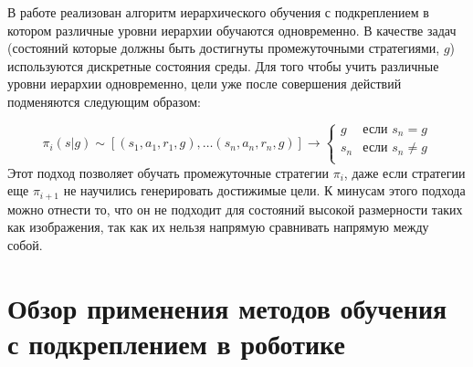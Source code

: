 В работе \cite{levy2017learning} реализован алгоритм иерархического обучения с подкреплением в котором различные уровни иерархии обучаются одновременно. В качестве задач (состояний которые должны быть достигнуты промежуточными стратегиями, $g$) используются дискретные состояния среды. Для того чтобы учить различные уровни иерархии одновременно, цели уже после совершения действий подменяются следующим образом: 

\begin{equation}
    \pi_i(s|g) \sim [(s_1,a_1,r_1,g), \ldots (s_n,a_n,r_n,g)] \to \begin{cases}
        g & \text{если $s_n = g$}\\
        s_n & \text{если $s_n \neq g$}\\
    \end{cases}
\end{equation}
Этот подход позволяет обучать промежуточные стратегии $\pi_i$, даже если стратегии еще $\pi_{i+1}$ не научились генерировать достижимые цели. К минусам этого подхода можно отнести то, что он не подходит для состояний высокой размерности таких как изображения, так как их нельзя напрямую сравнивать напрямую между собой. 




\section{Обзор применения методов обучения с подкреплением в роботике}\label{sec:ch1/sec2}

